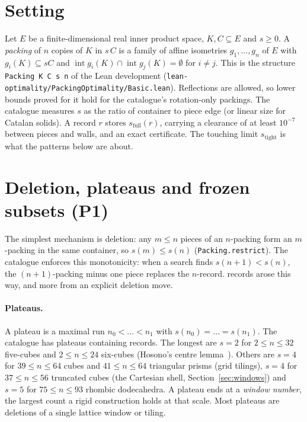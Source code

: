 \documentclass[11pt,a4paper]{article}
\newcommand{\code}[1]{\texttt{\nolinkurl{#1}}}
\newcommand{\lean}[1]{\texttt{#1}}
\theoremstyle{definition}
\theoremstyle{remark}
\begin{document}
\section{Setting}

Let $E$ be a finite-dimensional real inner product space, $K,C\subseteq E$ and $s\ge 0$. A \emph{packing} of $n$ copies of $K$ in $s\,C$ is a family of affine isometries $g_1,\dots,g_n$ of $E$ with $g_i(K)\subseteq sC$ and $\operatorname{int} g_i(K)\cap \operatorname{int} g_j(K)=\emptyset$ for $i\neq j$. This is the structure \lean{Packing K C s n} of the Lean development (\code{lean-optimality/PackingOptimality/Basic.lean}). Reflections are allowed, so lower bounds proved for it hold for the catalogue's rotation-only packings. The catalogue measures $s$ as the ratio of container to piece edge (or linear size for Catalan solids). A record $r$ stores $s_{\mathrm{full}}(r)$, carrying a clearance of at least $10^{-7}$ between pieces and walls, and an exact certificate. The touching limit $s_{\mathrm{tight}}$ is what the patterns below are about.

\section{Deletion, plateaus and frozen subsets (P1)}\label{sec:deletion}

The simplest mechanism is deletion: any $m\le n$ pieces of an $n$-packing form an $m$-packing in the same container, so $s(m)\le s(n)$ (\lean{Packing.restrict}). The catalogue enforces this monotonicity: when a search finds $s(n+1)<s(n)$, the $(n+1)$-packing minus one piece replaces the $n$-record. \nMonotone{} records arose this way, and \nDescend{} more from an explicit deletion move.

\paragraph{Plateaus.} A plateau is a maximal run $n_0<\dots<n_1$ with $s(n_0)=\dots=s(n_1)$. The catalogue has \nPlateaus{} plateaus containing \nPlateauRecords{} records. The longest are $s=2$ for $2\le n\le 32$ five-cubes and $2\le n\le 24$ six-cubes (Hosono's centre lemma~\cite{hosono}). Others are $s=4$ for $39\le n\le 64$ cubes and $41\le n\le 64$ triangular prisms (grid tilings), $s=4$ for $37\le n\le 56$ truncated cubes (the Cartesian shell, Section~\ref{sec:windows}) and $s=5$ for $75\le n\le 93$ rhombic dodecahedra. A plateau ends at a \emph{window number}, the largest count a rigid construction holds at that scale. Most plateaus are deletions of a single lattice window or tiling.
\end{document}
